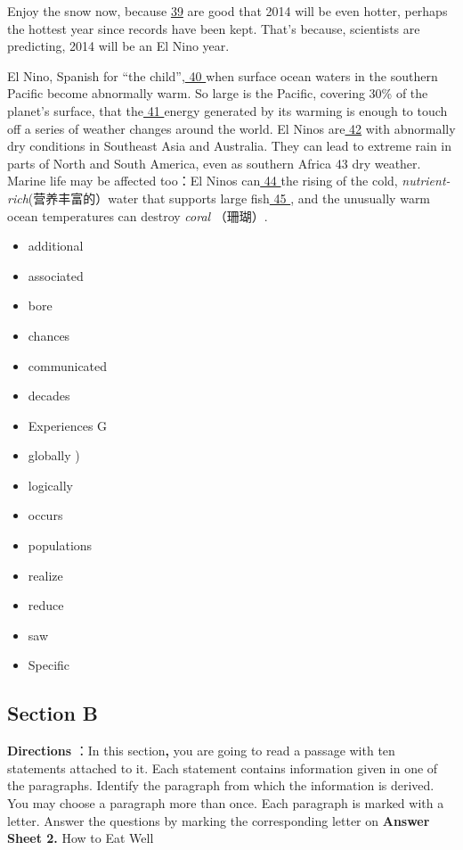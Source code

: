 \documentclass[UTF8,11pt]{ctexart}
\begin{document}
Enjoy the snow now, because \uline{39} are good that 2014 will be even hotter, perhaps the hottest year since records have been kept. That’s because, scientists are predicting, 2014 will be an El Nino year.


El Nino, Spanish for “the child”,\uline{ 40 }when surface ocean waters in the southern Pacific become abnormally warm. So large is the Pacific, covering 30\% of the planet’s surface, that the\uline{ 41 }energy generated by its warming is enough to touch off a series of weather changes around the world. El Ninos are\uline{ 42} with abnormally dry conditions in Southeast Asia and Australia. They can lead to extreme rain in parts of North and South America, even as southern Africa 43 dry weather. Marine life may be affected too：El Ninos can\uline{ 44 }the rising of the cold,\textit{ nutrient-rich}(营养丰富的）water that supports large fish\uline{ 45 }, and the unusually warm ocean temperatures can destroy\textit{ coral} （珊瑚）.


\begin{itemize}[leftmargin=2em,itemsep=.2em,topsep=.4em]\item[A.] additional
\item[B.] associated
\item[C.] bore
\item[D.] chances
\item[E.] communicated
\item[F.] decades
\item[G.] Experiences G
\item[H.] globally )
\item[I.] logically
\item[J.] occurs
\item[K.] populations
\item[L.] realize
\item[M.] reduce
\item[N.] saw
\item[O.] Specific
\end{itemize}

\subsection*{\textbf{Section B}}


\textbf{Directions} ：In this section\textbf{,} you are going to read a passage with ten statements attached to it. Each statement contains information given in one of the paragraphs. Identify the paragraph from which the information is derived. You may choose a paragraph more than once. Each paragraph is marked with a letter. Answer the questions by marking the corresponding letter on\textbf{ Answer Sheet 2.} How to Eat Well
\end{document}
